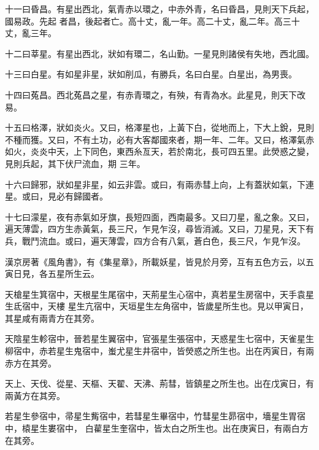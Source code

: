 \begin{pinyinscope}
 十一曰昏昌。有星出西北，氣青赤以環之，中赤外青，名曰昏昌，見則天下兵起，國易政。先起
 者昌，後起者亡。高十丈，亂一年。高二十丈，亂二年。高三十丈，亂三年。



 十二曰莘星。有星出西北，狀如有環二，名山勤。一星見則諸侯有失地，西北國。



 十三曰白星。有如星非星，狀如削瓜，有勝兵，名曰白星。白星出，為男喪。



 十四曰菟昌。西北菟昌之星，有赤青環之，有殃，有青為水。此星見，則天下改易。



 十五曰格澤，狀如炎火。又曰，格澤星也，上黃下白，從地而上，下大上銳，見則不種而獲。又曰，不有土功，必有大客鄰國來者，期一年、二年。又曰，格澤氣赤如火，炎炎中天，上下同色，東西糸亙天，若於南北，長可四五里。此熒惑之變，見則兵起，其下伏尸流血，期
 三年。



 十六曰歸邪，狀如星非星，如云非雲。或曰，有兩赤彗上向，上有蓋狀如氣，下連星。或曰，見必有歸國者。



 十七曰濛星，夜有赤氣如牙旗，長短四面，西南最多。又曰刀星，亂之象。又曰，遍天薄雲，四方生赤黃氣，長三尺，乍見乍沒，尋皆消滅。又曰，刀星見，天下有兵，戰鬥流血。或曰，遍天薄雲，四方合有八氣，蒼白色，長三尺，乍見乍沒。



 漢京房著《風角書》，有《集星章》，所載妖星，皆見於月旁，互有五色方云，以五寅日見，各五星所生云。



 天槍星生箕宿中，天根星生尾宿中，天荊星生心宿中，真若星生房宿中，天手袁星生氐宿中，天樓
 星生亢宿中，天垣星生左角宿中，皆歲星所生也。見以甲寅日，其星咸有兩青方在其旁。



 天陰星生軫宿中，晉若星生翼宿中，官張星生張宿中，天惑星生七宿中，天雀星生柳宿中，赤若星生鬼宿中，蚩尤星生井宿中，皆熒惑之所生也。出在丙寅日，有兩赤方在其旁。



 天上、天伐、從星、天樞、天翟、天沸、荊彗，皆鎮星之所生也。出在戊寅日，有兩黃方在其旁。



 若星生參宿中，帚星生觜宿中，若彗星生畢宿中，竹彗星生昴宿中，墻星生胃宿中，榬星生婁宿中，
 白雚星生奎宿中，皆太白之所生也。出在庚寅日，有兩白方在其旁。




\end{pinyinscope}
